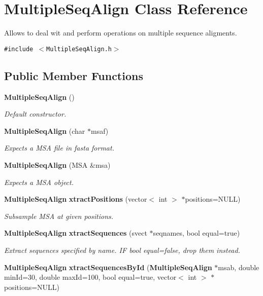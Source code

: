 \section{Multiple\-Seq\-Align Class Reference}
\label{classMultipleSeqAlign}
Allows to deal wit and perform operations on multiple sequence aligments.  


{\tt \#include $<$Multiple\-Seq\-Align.h$>$}

\subsection*{Public Member Functions}
\begin{CompactItemize}
\item 
{\bf Multiple\-Seq\-Align} ()\label{classMultipleSeqAlign_a0}

\begin{CompactList}\small\item\em Default constructor. \item\end{CompactList}\item 
{\bf Multiple\-Seq\-Align} (char $\ast$msaf)
\begin{CompactList}\small\item\em Expects a MSA file in fasta format. \item\end{CompactList}\item 
{\bf Multiple\-Seq\-Align} (MSA \&msa)\label{classMultipleSeqAlign_a2}

\begin{CompactList}\small\item\em Expects a MSA object. \item\end{CompactList}\item 
{\bf Multiple\-Seq\-Align} {\bf xtract\-Positions} (vector$<$ int $>$ $\ast$positions=NULL)\label{classMultipleSeqAlign_a3}

\begin{CompactList}\small\item\em Subsample MSA at given positions. \item\end{CompactList}\item 
{\bf Multiple\-Seq\-Align} {\bf xtract\-Sequences} (svect $\ast$seqnames, bool equal=true)\label{classMultipleSeqAlign_a4}

\begin{CompactList}\small\item\em Extract sequences specified by name. IF bool equal=false, drop them instead. \item\end{CompactList}\item 
{\bf Multiple\-Seq\-Align} {\bf xtract\-Sequences\-By\-Id} ({\bf Multiple\-Seq\-Align} $\ast$msab, double min\-Id=30, double max\-Id=100, bool equal=true, vector$<$ int $>$ $\ast$positions=NULL)\label{classMultipleSeqAlign_a5}


\end{CompactItemize}
